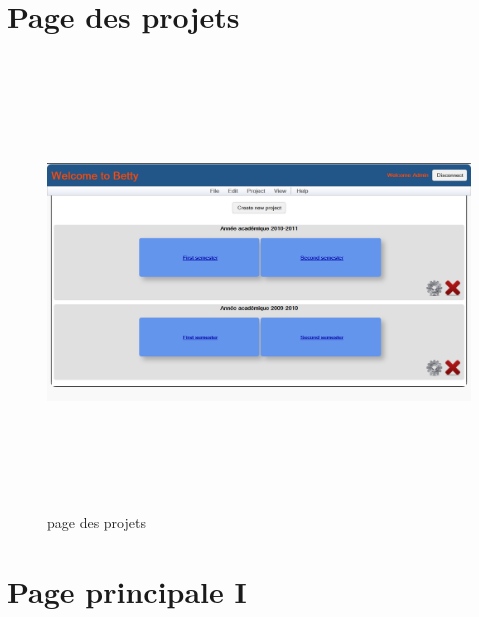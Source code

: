 \newpage

\section{Page des projets}
\label{annexe/espace_nom}

\begin{figure}[!h]
	\begin{center}
		\includegraphics[width=19cm,height=12cm,angle=90]{ProjectPage.png}
		\caption{page des projets}
	\end{center}
\end{figure}\newpage

\newpage

\section{Page principale I}
\label{annexe/espace_nom}

